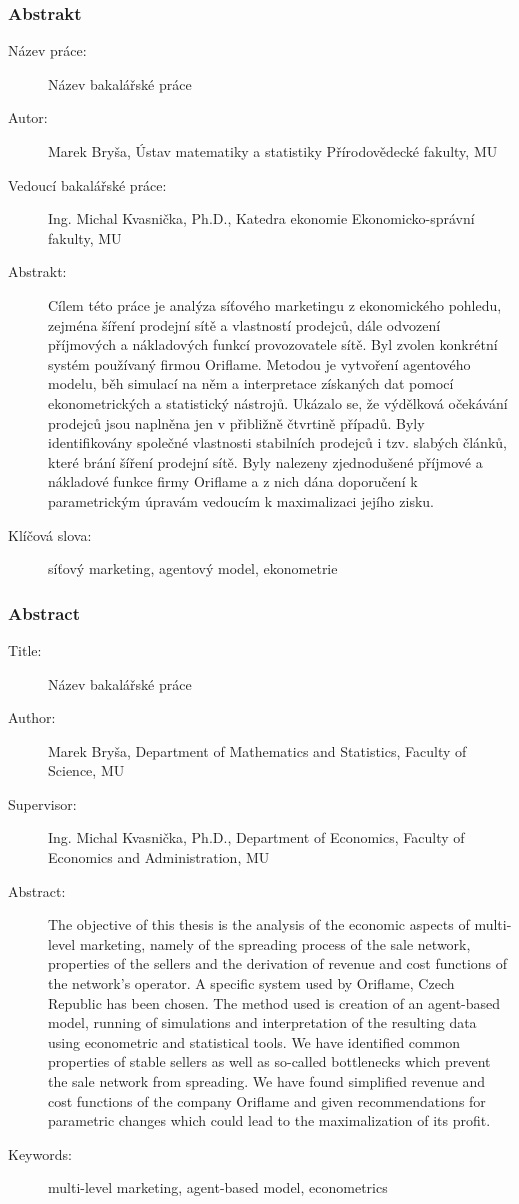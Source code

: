 \documentclass[a4wide,12pt]{report}
\begin{document}
\subsubsection{\large Abstrakt}
\begin{description}
\item[Název práce:] Název bakalářské práce
\item[Autor:] Marek Bryša, Ústav matematiky a statistiky Přírodovědecké fakulty, MU
\item[Vedoucí bakalářské práce:] Ing. Michal Kvasnička, Ph.D., Katedra ekonomie Ekonomicko-správní fakulty, MU
\item[Abstrakt:] Cílem této práce je analýza síťového marketingu z ekonomického pohledu, zejména šíření prodejní sítě a vlastností prodejců, dále odvození příjmových a nákladových funkcí provozovatele sítě. Byl zvolen konkrétní systém používaný firmou Oriflame. Metodou je vytvoření agentového modelu, běh simulací na něm a interpretace získaných dat pomocí ekonometrických a statistický nástrojů. Ukázalo se, že výdělková očekávání prodejců jsou naplněna jen v přibližně čtvrtině případů. Byly identifikovány společné vlastnosti stabilních prodejců i tzv. slabých článků, které brání šíření prodejní sítě. Byly nalezeny zjednodušené příjmové a nákladové funkce firmy Oriflame a z nich dána doporučení k parametrickým úpravám vedoucím k maximalizaci jejího zisku.
\item[Klíčová slova:] síťový marketing, agentový model, ekonometrie
\end{description}
\subsubsection{\large Abstract}
\begin{description}
\item[Title:] Název bakalářské práce
\item[Author:] Marek Bryša, Department of Mathematics and Statistics, Faculty of Science, MU
\item[Supervisor:] Ing. Michal Kvasnička, Ph.D., Department of Economics, Faculty of Economics and Administration, MU
\item[Abstract:] The objective of this thesis is the analysis of the economic aspects of multi-level marketing, namely of the spreading process of the sale network, properties of the sellers and the derivation of revenue and cost functions of the network's operator. A specific system used by Oriflame, Czech Republic has been chosen. The method used is creation of an agent-based model, running of simulations and interpretation of the resulting data using econometric and statistical tools. We have identified common properties of stable sellers as well as so-called bottlenecks which prevent the sale network from spreading. We have found simplified revenue and cost functions of the company Oriflame and given recommendations for parametric changes which could lead to the maximalization of its profit.
\item[Keywords:] multi-level marketing, agent-based model, econometrics
\end{description}
\newpage
\tableofcontents
\end{document}
